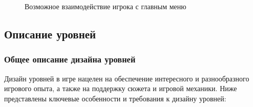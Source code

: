 \documentclass{article}
\begin{document}
\begin{figure}[h]
    \caption{Возможное взаимодействие игрока с главным меню}
    \label{ris:image}
\end{figure}
\subsection{Описание уровней}
\subsubsection{Общее описание дизайна уровней}

Дизайн уровней в игре нацелен на обеспечение интересного и разнообразного игрового опыта, а также на поддержку сюжета и игровой механики. Ниже представлены ключевые особенности и требования к дизайну уровней:
\end{document}
